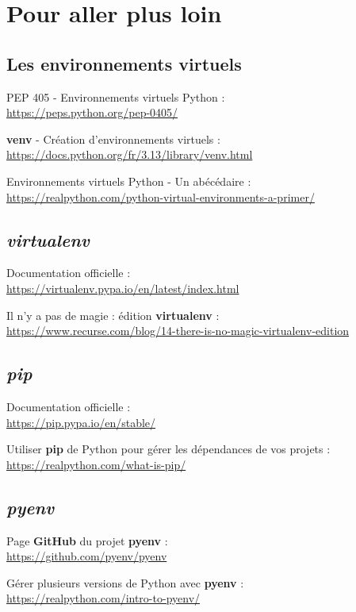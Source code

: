 \chapter{Pour aller plus loin}

\section*{Les environnements virtuels}
\begin{coloredenum}
    \item PEP 405 - Environnements virtuels Python :\\ \url{https://peps.python.org/pep-0405/}
    \item \textbf{venv} - Création d'environnements virtuels :\\ \url{https://docs.python.org/fr/3.13/library/venv.html}
    \item Environnements virtuels Python - Un abécédaire : \\ \url{https://realpython.com/python-virtual-environments-a-primer/}
\end{coloredenum}

\section*{\textit{virtualenv}}
\begin{coloredenum}
    \item Documentation officielle :\\ \url{https://virtualenv.pypa.io/en/latest/index.html}
    \item Il n'y a pas de magie : édition \textbf{virtualenv} :\\ \url{https://www.recurse.com/blog/14-there-is-no-magic-virtualenv-edition}
\end{coloredenum}

\section*{\textit{pip}}
\begin{coloredenum}
    \item Documentation officielle :\\ \url{https://pip.pypa.io/en/stable/}
    \item Utiliser \textbf{pip} de Python pour gérer les dépendances de vos projets :\\ \url{https://realpython.com/what-is-pip/}
\end{coloredenum}

\section*{\textit{pyenv}}
\begin{coloredenum}
\item Page \textbf{GitHub} du projet \textbf{pyenv} :\\ \url{https://github.com/pyenv/pyenv}
    \item Gérer plusieurs versions de Python avec \textbf{pyenv} :\\ \url{https://realpython.com/intro-to-pyenv/}
\end{coloredenum}
